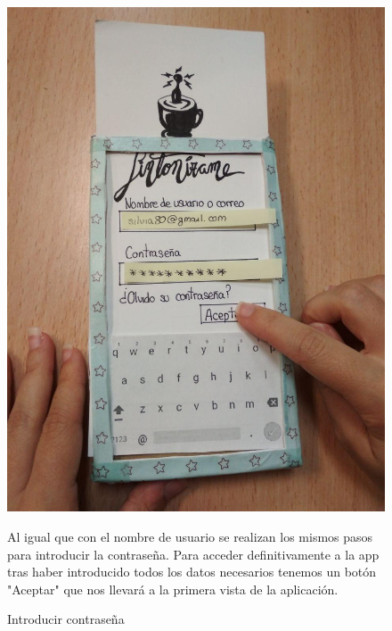\documentclass[a4paper]{article}
\begin{document}
\begin{center}
\begin{figure}[H]
\includegraphics[width=0.4\columnwidth]{T1-8.jpg} 
\caption{Introducir contraseña}
Al igual que con el nombre de usuario se realizan los mismos pasos para introducir la contraseña. Para acceder definitivamente a la app tras haber introducido todos los datos necesarios tenemos un botón "Aceptar" que nos llevará a la primera vista de la aplicación.
\label{fig:t1-7}
\end{figure}
\end{center}
\end{document}
